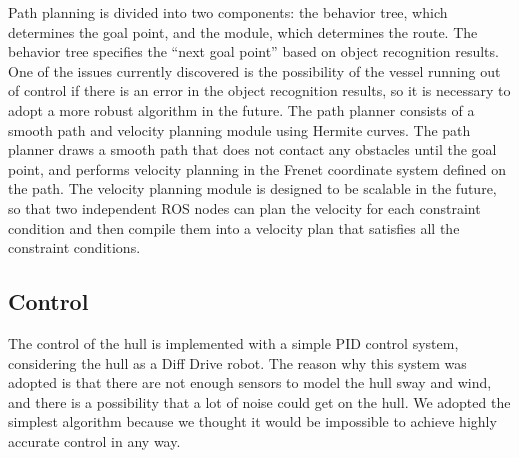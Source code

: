 \documentclass[lettersize,journal]{IEEEtran}
\begin{document}
Path planning is divided into two components: the behavior tree, which determines the goal point, and the module, which determines the route.
The behavior tree specifies the “next goal point” based on object recognition results.
One of the issues currently discovered is the possibility of the vessel running out of control if there is an error in the object recognition results, so it is necessary to adopt a more robust algorithm in the future.
The path planner consists of a smooth path and velocity planning module using Hermite curves.
The path planner draws a smooth path that does not contact any obstacles until the goal point, and performs velocity planning in the Frenet coordinate system defined on the path.
The velocity planning module is designed to be scalable in the future, so that two independent ROS nodes can plan the velocity for each constraint condition and then compile them into a velocity plan that satisfies all the constraint conditions.

\subsection{Control}

The control of the hull is implemented with a simple PID control system, considering the hull as a Diff Drive robot.
The reason why this system was adopted is that there are not enough sensors to model the hull sway and wind, and there is a possibility that a lot of noise could get on the hull.
We adopted the simplest algorithm because we thought it would be impossible to achieve highly accurate control in any way.
\end{document}
